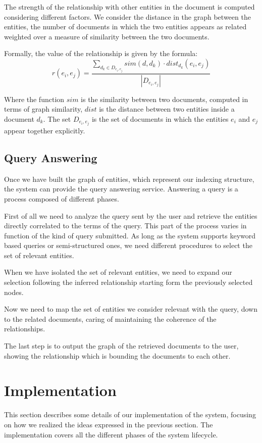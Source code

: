 \documentclass{acm_proc_article-sp-sigmod07}
\begin{document}
The strength of the relationship with other entities in the document is
computed considering different factors.
We consider the distance in the graph between the entities, the number of
documents in which the two entities appears as related weighted over a
measure of similarity between the two documents.

Formally, the value of the relationship is given by the formula:
$$
r(e_{i}, e_{j}) = \frac{ \sum_{d_{k} \in D_{e_{i}, e_{j}} } {sim(d, d_{k}) } \cdot
dist_{d_{k}}(e_{i},e_{j}) }{|D_{e_{i},e_{j} }|}
$$

Where the function $sim$ is the similarity between two documents, computed
in terms of graph similarity, $dist$ is the distance between two entities
inside a document $d_{k}$.
The set $D_{e_{i}, e_{j}}$ is the set of documents in which the entities
$e_{i}$ and $e_{j}$ appear together explicitly.


\subsection{Query Answering}
Once we have built the graph of entities, which represent our indexing
structure, the system can provide the query answering service.
Answering a query is a process composed of different phases.

First of all we need to analyze the query sent by the user and retrieve
the entities directly correlated to the terms of the query.
This part of the process varies in function of the kind of query
submitted. As long as the system supports keyword based queries or
semi-structured ones, we need different procedures to select the set of
relevant entities.

When we have isolated the set of relevant entities, we need to expand our
selection following the inferred relationship starting form the previously
selected nodes.

Now we need to map the set of entities we consider relevant with the
query, down to the related documents, caring of maintaining the coherence
of the relationships.

The last step is to output the graph of the retrieved documents to the
user, showing the relationship which is bounding the documents to each
other.

\section{Implementation}
This section describes some details of our implementation of the system,
focusing on how we realized the ideas expressed in the previous section.
The implementation covers all the different phases of the system
lifecycle.
\end{document}
